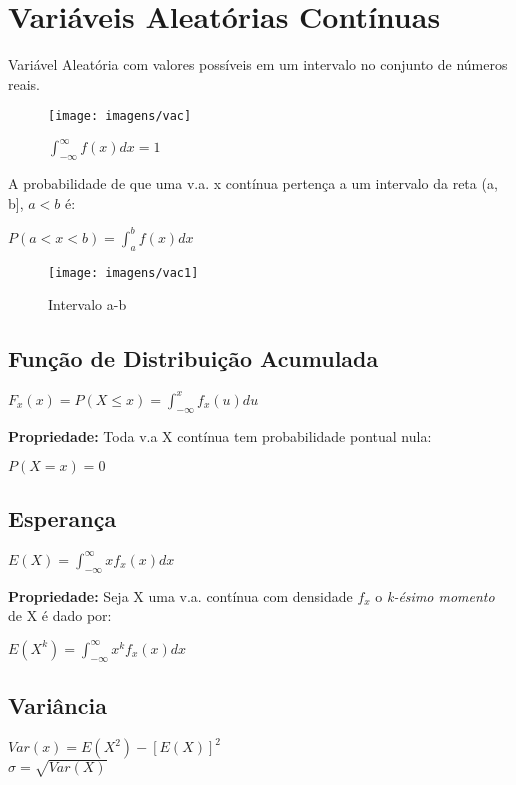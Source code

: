 \documentclass[a4paper, 12pt]{article}
\begin{document}
\section{Variáveis Aleatórias Contínuas}
Variável Aleatória com valores possíveis em um intervalo no conjunto de números reais.
	
	\begin{figure}[h]
		\centering
		\texttt{[image: imagens/vac]}
		\caption{$\int_{-\infty}^{\infty} f(x)dx = 1$}
		\label{fig:vac}
	\end{figure}
	
	A probabilidade de que uma v.a. x contínua pertença a um intervalo da reta (a, b], $a < b$ é:
	
	\begin{center}
		\Large
		$
		P(a<x<b) = \int_{a}^{b} f(x)dx
		$
	\end{center}
	\begin{figure}[h]
		\centering
		\texttt{[image: imagens/vac1]}
		\caption{Intervalo a-b}
		\label{fig:vac1}
	\end{figure}
	
\subsection{Função de Distribuição Acumulada}
	\begin{center}
		\Large
		$
		F_{x}(x) = P(X\leq x) = \int_{-\infty}^{x} f_{x}(u)du
		$
	\end{center}
	
	\textbf{Propriedade:} Toda v.a X contínua tem probabilidade pontual nula:
	\begin{center}
		\Large
		$
		P(X = x) = 0
		$
	\end{center}
	
\subsection{Esperança}
	\begin{center}
		\Large
		$
		E(X) = \int_{-\infty}^{\infty}x f_{x}(x)dx
		$
	\end{center}
	\textbf{Propriedade:} Seja X uma v.a. contínua com densidade $f_{x}$ o \textit{k-ésimo momento} de X é dado por:
	\begin{center}
		\Large
		$
		E(X^{k})=\int_{-\infty}^{\infty}x^{k}f_{x}(x)dx
		$
	\end{center}

\subsection{Variância}
	\begin{center}
		\Large
		$
		Var(x) = E(X^{2}) - [E(X)]^{2}
		$\\
		$
		\sigma = \sqrt{Var(X)}
		$
	\end{center}
	
\end{document}
